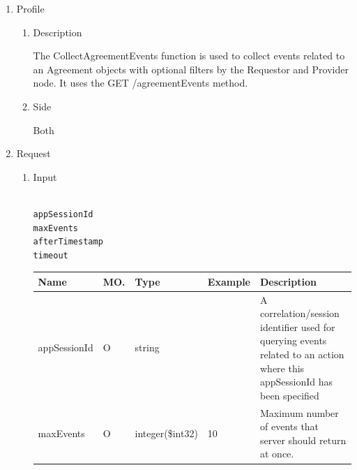 \begin{enumerate}

\item Profile

\begin{enumerate}

\item Description

The CollectAgreementEvents function is used to collect events related to an Agreement objects with optional filters by the Requestor and Provider node. 
It uses the GET /agreementEvents method.

\item Side

Both

\end{enumerate}

\item Request

\begin{enumerate}

\item Input

\begin{tcolorbox}[boxrule=0pt, frame empty]
\begin{verbatim}

appSessionId
maxEvents
afterTimestamp
timeout

\end{verbatim}
\end{tcolorbox}


\begin{center}
\begin{tabular}{|p{3cm}|l|p{3cm}|p{3cm}|p{4cm}|} 
\hline
\rowcolor{lightgray}	Name	& MO.	& Type	& Example & 	Description \\
\hline

appSessionId	& O & 	string				&			& A correlation/session identifier used for querying events related to an action where this appSessionId has been specified \\
\hline

maxEvents			& O	& 	integer(\$int32)		&	10	&	Maximum number of events that server should return at once. \\ 
\hline


\end{tabular}
\end{center}
\end{enumerate}
\end{enumerate}
